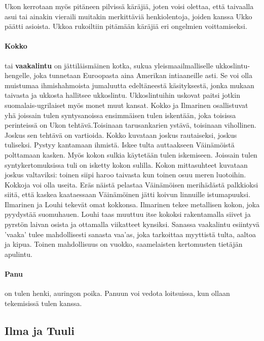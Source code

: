     Ukon kerrotaan myös pitäneen pilvissä käräjiä, joten voisi olettaa, että taivaalla asui 
    tai ainakin vieraili muitakin merkittäviä henkiolentoja, joiden kanssa Ukko päätti asioista. 
    Ukkoa rukoiltiin pitämään käräjiä eri ongelmien voittamiseksi.

  \paragraph{Kokko} tai \textbf{vaakalintu} on jättiläismäinen kotka, sukua yleismaailmalliselle 
    ukkoslintu-hengelle, joka tunnetaan Euroopasta aina Amerikan intiaaneille asti. Se voi olla 
    muistumaa ihmishahmoista jumaluutta edeltäneestä käsityksestä, jonka mukaan taivasta ja 
    ukkosta hallitsee ukkoslintu. Ukkoslintuihin uskovat paitsi jotkin suomalais-ugrilaiset myös 
    monet muut kansat. Kokko ja Ilmarinen osallistuvat yhä joissain tulen syntysanoissa 
    ensimmäisen tulen iskentään, joka toisissa perinteissä on Ukon tehtävä.Toisinaan 
    tarusankarien ystävä, toisinaan vihollinen. Joskus sen tehtävä on vartioida. Kokko kuvataan 
    joskus rautaiseksi, joskus tuliseksi. Pystyy kantamaan ihmistä. Iskee tulta auttaakseen 
    Väinämöistä polttamaan kasken. Myös kokon sulkia käytetään tulen iskemiseen. Joissain tulen 
    syntykertomuksissa tuli on isketty kokon sulilla. Kokon mittasuhteet kuvataan joskus 
    valtaviksi: toinen siipi haroo taivasta kun toinen osuu meren luotoihin. Kokkoja voi olla 
    useita. Eräs näistä pelastaa Väinämöisen merihädästä palkkioksi siitä, että kaskea 
    kaataessaan Väinämöinen jätti koivun linnuille istumapuuksi. Ilmarinen ja Louhi tekevät 
    omat kokkonsa. Ilmarinen tekee metallisen kokon, joka pyydystää suomuhauen. Louhi taas 
    muuttuu itse kokoksi rakentamalla siivet ja pyrstön laivan osista ja ottamalla viikatteet 
    kynsiksi. Sanassa vaakalintu esiintyvä ’vaaka’ tulee mahdollisesti sanasta vaa’as, joka 
    tarkoittaa myyttistä tulta, aaltoa ja kipua. Toinen mahdollisuus on vuokko, saamelaisten 
    kertomusten tietäjän apulintu.
  \paragraph{Panu} on tulen henki, auringon poika. Panuun voi vedota loitsuissa, kun ollaan 
    tekemisissä tulen kanssa. 

  
  
\subsection{Ilma ja Tuuli}


